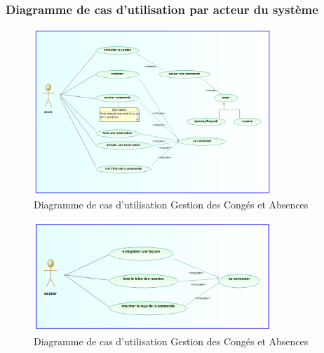 \subsubsection{Diagramme de cas d'utilisation par acteur du système}
\begin{figure}[H]
    \centering
    \includegraphics[width=0.8\textwidth]{images/diagrammes/use-cases/client.png}
    \caption{Diagramme de cas d'utilisation Gestion des Congés et Absences}
    \label{fig:use_case_gestion_conges}

\end{figure}


\begin{figure}[H]
    \centering
    \includegraphics[width=0.8\textwidth]{images/diagrammes/use-cases/caissier.png}
    \caption{Diagramme de cas d'utilisation Gestion des Congés et Absences}
    \label{fig:use_case_gestion_conges}

\end{figure}


